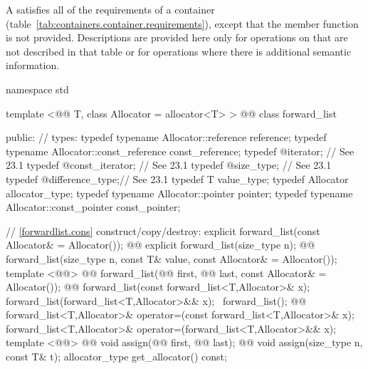 \documentclass[american,twoside]{book}
\begin{document}
\pnum
A  satisfies all of the requirements of a container (table~\ref{tab:containers.container.requirements}), except that the  member function is not provided. Descriptions are provided here only for operations on  that are not described in that table or for operations where there is additional semantic information.

\begin{codeblock}
namespace std { 
  template <@@ T, class Allocator = allocator<T> > 
  @@
  class forward_list { 
  public: 
    // types: 
    typedef typename Allocator::reference reference; 
    typedef typename Allocator::const_reference const_reference; 
    typedef @\impdef@ iterator;       // See 23.1 
    typedef @\impdef@ const_iterator; // See 23.1 
    typedef @\impdef@ size_type;      // See 23.1 
    typedef @\impdef@ difference_type;// See 23.1 
    typedef T value_type; 
    typedef Allocator allocator_type; 
    typedef typename Allocator::pointer pointer; 
    typedef typename Allocator::const_pointer const_pointer; 

    // \ref{forwardlist.cons} construct/copy/destroy: 
    explicit forward_list(const Allocator& = Allocator()); 
    @@ explicit forward_list(size_type n);
    @@ 
      forward_list(size_type n, const T& value, 
                   const Allocator& = Allocator()); 
    template <@@>
      @@
      forward_list(@@ first, @@ last, 
                   const Allocator& = Allocator()); 
    @@ forward_list(const forward_list<T,Allocator>& x);
    forward_list(forward_list<T,Allocator>&& x);
    ~forward_list(); 
    @@ 
      forward_list<T,Allocator>& operator=(const forward_list<T,Allocator>& x);
    forward_list<T,Allocator>& operator=(forward_list<T,Allocator>&& x); 
    template <@@> 
      @@
      void assign(@@ first, @@ last); 
    @@ void assign(size_type n, const T& t); 
    allocator_type get_allocator() const; 

}}
\end{codeblock}
\end{document}

